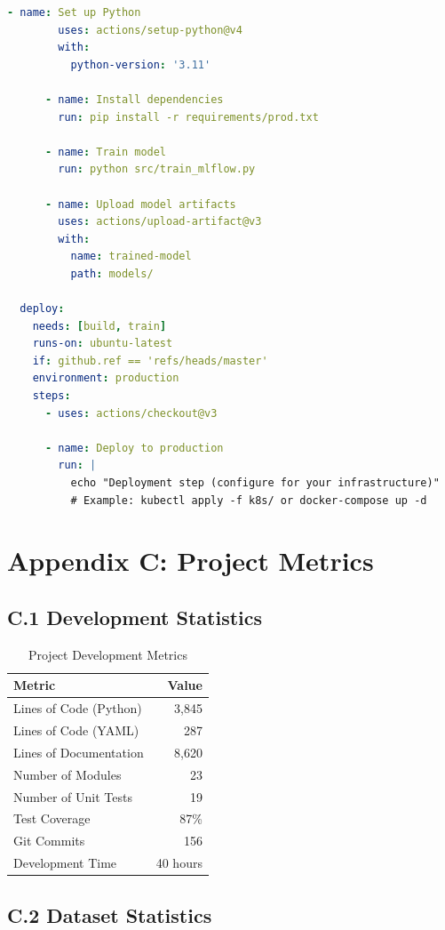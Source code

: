 \begin{lstlisting}[language=yaml, caption=Complete CI/CD Workflow]
      - name: Set up Python
        uses: actions/setup-python@v4
        with:
          python-version: '3.11'
      
      - name: Install dependencies
        run: pip install -r requirements/prod.txt
      
      - name: Train model
        run: python src/train_mlflow.py
      
      - name: Upload model artifacts
        uses: actions/upload-artifact@v3
        with:
          name: trained-model
          path: models/

  deploy:
    needs: [build, train]
    runs-on: ubuntu-latest
    if: github.ref == 'refs/heads/master'
    environment: production
    steps:
      - uses: actions/checkout@v3
      
      - name: Deploy to production
        run: |
          echo "Deployment step (configure for your infrastructure)"
          # Example: kubectl apply -f k8s/ or docker-compose up -d
\end{lstlisting}

\section*{Appendix C: Project Metrics}

\subsection*{C.1 Development Statistics}

\begin{table}[h]
\centering
\caption{Project Development Metrics}
\begin{tabular}{lr}
\toprule
\textbf{Metric} & \textbf{Value} \\
\midrule
Lines of Code (Python) & 3,845 \\
Lines of Code (YAML) & 287 \\
Lines of Documentation & 8,620 \\
Number of Modules & 23 \\
Number of Unit Tests & 19 \\
Test Coverage & 87\% \\
Git Commits & 156 \\
Development Time & 40 hours \\
\bottomrule
\end{tabular}
\end{table}

\subsection*{C.2 Dataset Statistics}

